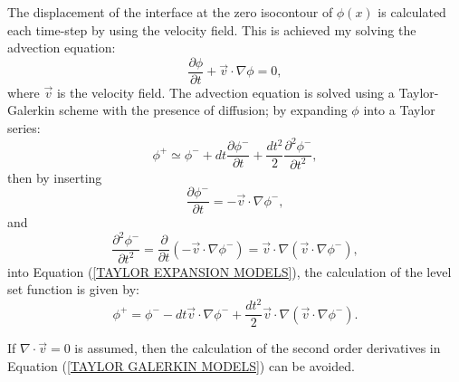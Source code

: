 The displacement of the interface at the zero isocontour of $\phi(x)$ is calculated each time-step by using the velocity field. This is achieved my solving the advection equation:
%
\begin{equation}
\frac{\partial \phi}{\partial t} + \vec{v} \cdot \nabla \phi = 0,
\label{ADVECTION MODELS}
\end{equation}
%
where $\vec{v}$ is the velocity field. The advection equation is solved using a Taylor-Galerkin scheme with the presence of diffusion; by expanding $\phi$ into a Taylor series:
%
\begin{equation}
\phi^{+} \simeq \phi^{-} + dt\frac{\partial \phi^{-}}{\partial t} + \frac{dt^2}{2}\frac{\partial^{2}\phi^{-}}{\partial t^{2}},
\label{TAYLOR EXPANSION MODELS}
\end{equation}
%
then by inserting
%
\begin{equation}
\frac{\partial \phi^{-}}{\partial t} = - \vec{v} \cdot \nabla \phi^{-},
\label{INSERT ADVECTION MODELS}
\end{equation}
%
and
%
\begin{equation}
\frac{\partial^{2} \phi^{-}}{\partial t^{2}} = \frac{\partial}{\partial t}(-\vec{v} \cdot \nabla \phi^{-}) = \vec{v}\cdot \nabla (\vec{v}\cdot \nabla \phi^{-}),
\label{SECOND ORDER MODELS}
\end{equation}
%
into Equation (\ref{TAYLOR EXPANSION MODELS}), the calculation of the level set function is given by:
%
\begin{equation}
\phi^{+} = \phi^{-} - dt\vec{v}\cdot \nabla \phi^{-} + \frac{dt^2}{2}\vec{v}\cdot \nabla (\vec{v}\cdot \nabla \phi^{-}).
\label{TAYLOR GALERKIN MODELS}
\end{equation}

If $\nabla \cdot \vec{v}=0$ is assumed, then the calculation of the second order derivatives in Equation (\ref{TAYLOR GALERKIN MODELS}) can be avoided.

